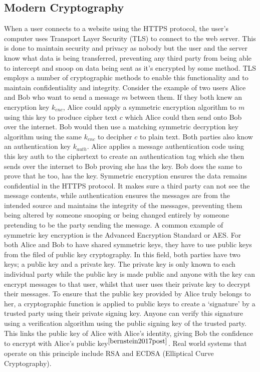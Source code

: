\documentclass[10pt,a4paper]{IEEEtran}
\begin{document}
\subsection{Modern Cryptography}
When a user connects to a website using the HTTPS protocol, the user's computer uses Transport Layer Security (TLS) to connect to the web server. This is done to maintain security and privacy as nobody but the user and the server know what data is being transferred, preventing any third party from being able to intercept and snoop on data being sent as it's encrypted by some method. TLS employs a number of cryptographic methods to enable this functionality and to maintain confidentiality and integrity.
\newline
\newline
Consider the example of two users Alice and Bob who want to send a message \(m\) between them. If they both knew an encryption key \(k_{enc}\), Alice could apply a symmetric encryption algorithm to \(m\) using this key to produce cipher text \(c\) which Alice could then send onto Bob over the internet. Bob would then use a matching symmetric decryption key algorithm using the same \(k_{enc}\) to decipher \(c\) to plain text. Both parties also know an authentication key \(k_{auth}\). Alice applies a message authentication code using this key auth to the ciphertext to create an authentication tag which she then sends over the internet to Bob proving she has the key. Bob does the same to prove that he too, has the key. Symmetric encryption ensures the data remains confidential in the HTTPS protocol. It makes sure a third party can not see the message contents, while authentication ensures the messages are from the intended source and maintains the integrity of the messages, preventing them being altered by someone snooping or being changed entirely by someone pretending to be the party sending the message. A common example of symmetric key encryption is the Advanced Encryption Standard or AES.
\newline For both Alice and Bob to have shared symmetric keys, they have to use public keys from the filed of public key cryptography. In this field, both parties have two keys; a public key and a private key. The private key is only known to each individual party while the public key is made public and anyone with the key can encrypt messages to that user, whilst that user uses their private key to decrypt their messages.
\newline To ensure that the public key provided by Alice truly belongs to her,  a cryptographic function is applied to public keys to create a `signature' by a trusted party using their private signing key. Anyone can verify this signature using a verification algorithm using the public signing key of the trusted party. This links the public key of Alice with Alice's identity, giving Bob the confidence to encrypt with Alice's public key\(^{\cite{bernstein2017post}}\). Real world systems that operate on this principle include RSA and ECDSA (Elliptical Curve Cryptography).
\end{document}
